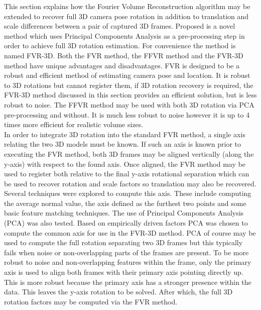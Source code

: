 
This section explains how the Fourier Volume Reconstruction algorithm may be extended to recover full 3D camera pose rotation in addition to translation and scale differences between a pair of captured 3D frames. Proposed is a novel method which uses Principal Components Analysis as a pre-processing step in order to achieve full 3D rotation estimation. For convenience the method is named FVR-3D. Both the FVR method, the FFVR method and the FVR-3D method have unique advantages and disadvantages. FVR is designed to be a robust and efficient method of estimating camera pose and location. It is robust to 3D rotations but cannot register them, if 3D rotation recovery is required, the FVR-3D method discussed in this section provides an efficient solution, but is less robust to noise. The FFVR method may be used with both 3D rotation via PCA pre-processing and without. It is much less robust to noise however it is up to 4 times more efficient for realistic volume sizes. \\

In order to integrate 3D rotation into the standard FVR method, a single axis relating the two 3D models must be known. If such an axis is known prior to executing the FVR method, both 3D frames may be aligned vertically (along the y-axis) with respect to the found axis. Once aligned, the FVR method may be used to register both relative to the final y-axis rotational separation which can be used to recover rotation and scale factors so translation may also be recovered. \\

Several techniques were explored to compute this axis. These include computing the average normal value, the axis defined as the furthest two points and some basic feature matching techniques. The use of Principal Components Analysis (PCA) was also tested. Based on empirically driven factors PCA was chosen to compute the common axis for use in the FVR-3D method. PCA of course may be used to compute the full rotation separating two 3D frames but this typically fails when noise or non-overlapping parts of the frames are present. To be more robust to noise and non-overlapping features within the frame, only the primary axis is used to align both frames with their primary axis pointing directly up. This is more robust because the primary axis has a stronger presence within the data. This leaves the y-axis rotation to be solved. After which, the full 3D rotation factors may be computed via the FVR method. \\


